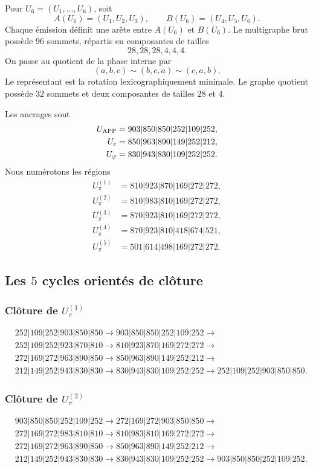 Pour \(U_6=(U_1,\ldots,U_6)\), soit
\[
 A(U_6)=(U_1,U_2,U_3),
 \qquad
 B(U_6)=(U_4,U_5,U_6).
\]
Chaque émission définit une arête entre \(A(U_6)\) et \(B(U_6)\). Le multigraphe
brut possède \(96\) sommets, répartis en composantes de tailles
\[
 28,28,28,4,4,4.
\]
On passe au quotient de la phase interne par
\[
 (a,b,c)\sim(b,c,a)\sim(c,a,b).
\]
Le représentant est la rotation lexicographiquement minimale. Le graphe
quotient possède \(32\) sommets et deux composantes de tailles \(28\) et \(4\).

Les ancrages sont
\[
\begin{aligned}
U_{\rm APP}&=903|850|850|252|109|252,\\
U_e&=850|963|890|149|252|212,\\
U_\varphi&=830|943|830|109|252|252.
\end{aligned}
\]
Nous numérotons les régions
\[
\begin{aligned}
U_\pi^{(1)}&=810|923|870|169|272|272,\\
U_\pi^{(2)}&=810|983|810|169|272|272,\\
U_\pi^{(3)}&=870|923|810|169|272|272,\\
U_\pi^{(4)}&=870|923|810|418|674|521,\\
U_\pi^{(5)}&=501|614|498|169|272|272.
\end{aligned}
\]

\subsection{Les \(5\) cycles orientés de clôture}

\subsubsection{Clôture de \texorpdfstring{\(U_\pi^{(1)}\)}{U-pi 1}}
\begin{align*}
&252|109|252|903|850|850\to
903|850|850|252|109|252\to\\
&252|109|252|923|870|810\to
810|923|870|169|272|272\to\\
&272|169|272|963|890|850\to
850|963|890|149|252|212\to\\
&212|149|252|943|830|830\to
830|943|830|109|252|252\to
252|109|252|903|850|850.
\end{align*}

\subsubsection{Clôture de \texorpdfstring{\(U_\pi^{(2)}\)}{U-pi 2}}
\begin{align*}
&903|850|850|252|109|252\to
272|169|272|903|850|850\to\\
&272|169|272|983|810|810\to
810|983|810|169|272|272\to\\
&272|169|272|963|890|850\to
850|963|890|149|252|212\to\\
&212|149|252|943|830|830\to
830|943|830|109|252|252\to
903|850|850|252|109|252.
\end{align*}

